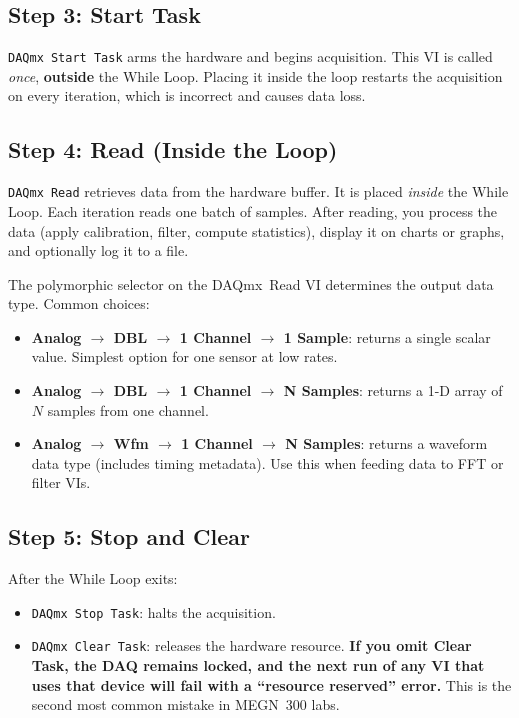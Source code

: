 \subsection{Step 3: Start Task}

\texttt{DAQmx Start Task} arms the hardware and begins acquisition. This VI is called \emph{once}, \textbf{outside} the While Loop. Placing it inside the loop restarts the acquisition on every iteration, which is incorrect and causes data loss.

\subsection{Step 4: Read (Inside the Loop)}

\texttt{DAQmx Read} retrieves data from the hardware buffer. It is placed \emph{inside} the While Loop. Each iteration reads one batch of samples. After reading, you process the data (apply calibration, filter, compute statistics), display it on charts or graphs, and optionally log it to a file.

The polymorphic selector on the DAQmx~Read VI determines the output data type. Common choices:

\begin{itemize}[nosep,leftmargin=1.5em]
\item \textbf{Analog $\to$ DBL $\to$ 1 Channel $\to$ 1 Sample}: returns a single scalar value. Simplest option for one sensor at low rates.
\item \textbf{Analog $\to$ DBL $\to$ 1 Channel $\to$ N Samples}: returns a 1-D array of $N$ samples from one channel.
\item \textbf{Analog $\to$ Wfm $\to$ 1 Channel $\to$ N Samples}: returns a waveform data type (includes timing metadata). Use this when feeding data to FFT or filter VIs.
\end{itemize}

\subsection{Step 5: Stop and Clear}

After the While Loop exits:

\begin{itemize}[nosep,leftmargin=1.5em]
\item \texttt{DAQmx Stop Task}: halts the acquisition.
\item \texttt{DAQmx Clear Task}: releases the hardware resource. \textbf{If you omit Clear Task, the DAQ remains locked, and the next run of any VI that uses that device will fail with a ``resource reserved'' error.} This is the second most common mistake in MEGN~300 labs.
\end{itemize}

